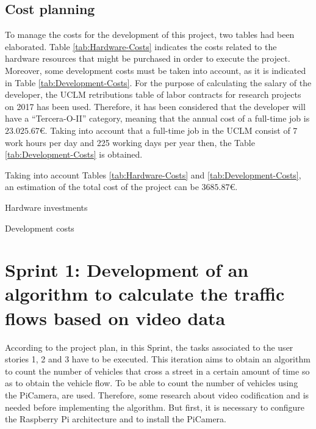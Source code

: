 \subsection{Cost planning}
To manage the costs for the development of this project, two tables had been elaborated. Table \ref{tab:Hardware-Costs} indicates the costs related to the hardware resources that might be purchased in order to execute the project. Moreover, some development costs must be taken into account, as it is indicated in Table \ref{tab:Development-Costs}. For the purpose of calculating the salary of the developer, the \ac{UCLM} retributions table of labor contracts for research projects on 2017 has been used. Therefore, it has been considered that the developer will have a “Tercera-O-II” category, meaning that the annual cost of a full-time job is $23.025.67$\euro{}. Taking into account that a full-time job in the UCLM consist of 7 work hours per day and 225 working days per year then, the Table \ref{tab:Development-Costs} is obtained. 

Taking into account Tables \ref{tab:Hardware-Costs} and \ref{tab:Development-Costs}, an estimation of the total cost of the project can be $3685.87$\euro{}.

\begin{table}[hp]
	\centering
	{\small
		
	}
	\caption{Hardware investments}
	\label{tab:Hardware-Costs}
\end{table}

\begin{table}[hp]
	\centering
	{\small
		
	}
	\caption{Development costs}
	\label{tab:Development-Costs}
\end{table}


\newpage
\section{Sprint 1: Development of an algorithm to calculate the traffic flows based on video data}
\label{Section:Sprint1}
According to the project plan, in this Sprint, the tasks associated to the user stories 1, 2 and 3 have to be executed. This iteration aims to obtain an algorithm to count the number of vehicles that cross a street in a certain amount of time so as to obtain the vehicle flow. To be able to count the number of vehicles using the PiCamera,  are used. Therefore, some research about video codification and  is needed before implementing the algorithm. But first, it is necessary to configure the Raspberry Pi architecture and to install the PiCamera. 

